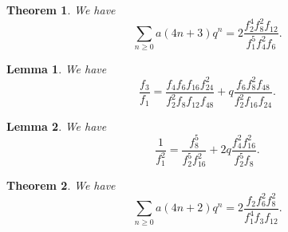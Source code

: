 \documentclass[10pt,a4paper]{amsart}
\newtheorem{theorem}{Theorem}
\newtheorem{lemma}{Lemma}
\begin{document}
\begin{theorem}
\label{JAS_id2}
We have 
$$
\sum_{n\geq 0} a(4n+3)q^n = 2\frac{f_2^4f_8^2f_{12}}{f_1^5f_4^2f_6}.
$$

\end{theorem}

\begin{lemma}
\label{lemma_f3overf1}
We have 
$$
\frac{f_3}{f_1} = \frac{f_4f_6f_{16}f_{24}^2}{f_2^2f_8f_{12}f_{48}} + q\frac{f_6f_8^2f_{48}}{f_2^2f_{16}f_{24}}.
$$
\end{lemma}

\begin{lemma}
\label{lemma_1overf1squared}
We have 
$$
\frac{1}{f_1^2} = \frac{f_8^5}{f_2^5f_{16}^2} + 2q\frac{f_4^2f_{16}^2}{f_2^5f_8}.
$$
\end{lemma}

\begin{theorem}
\label{JAS_id1}
We have 
$$
\sum_{n\geq 0} a(4n+2)q^n = 2\frac{f_2f_6^2f_8^2}{f_1^4f_3f_{12}}.
$$
\end{theorem}
\end{document}
